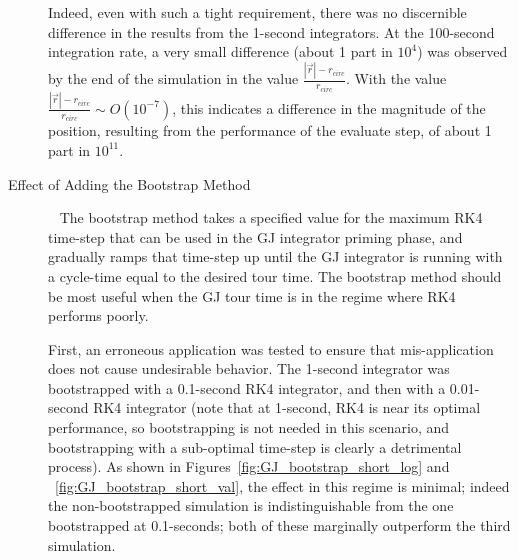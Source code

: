 \begin{description}
Indeed, even with such a tight requirement, there was no discernible 
difference in the results from the 1-second integrators.  At the 100-second 
integration rate, a very small difference (about 1 part in $10^4$) was 
observed by the end of the simulation in the value $\frac{|\vec{r}| - 
r_{circ}}{r_{circ}}$.  With the value $\frac{|\vec{r}| - 
r_{circ}}{r_{circ}} \sim O(10^{-7})$, this indicates a difference in the 
magnitude of the 
position, resulting from the performance of the evaluate step, of about 1 part 
in $10^{11}$.

\item[Effect of Adding the Bootstrap Method]\ \newline 
The bootstrap method takes a specified value for the maximum RK4 time-step 
that can be used in the GJ integrator priming phase, and gradually ramps that 
time-step up until the GJ integrator is running 
with a cycle-time equal to the desired tour time.  The bootstrap method 
should be most useful when the GJ tour time is in the regime where RK4 
performs poorly.

First, an erroneous application was tested to ensure that mis-application
does not cause undesirable behavior.  The 1-second integrator was 
bootstrapped with a 
0.1-second RK4 integrator, and then with a 0.01-second RK4 integrator (note 
that at 1-second, RK4 is near its optimal performance, so bootstrapping is 
not needed in this scenario, and bootstrapping with a sub-optimal time-step 
is clearly a detrimental process).  As shown in 
Figures~\ref{fig:GJ_bootstrap_short_log}
and ~\ref{fig:GJ_bootstrap_short_val}, the effect in this regime is minimal; 
indeed the 
non-bootstrapped simulation is indistinguishable from the one bootstrapped at 
0.1-seconds;  both of these marginally outperform the third simulation.


\end{description}
